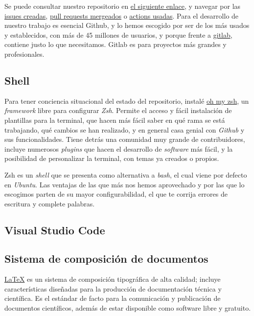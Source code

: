 Se puede consultar nuestro repositorio en \href{https://github.com/ElenaMerelo/TFG}{el siguiente enlace}, y navegar 
por las \href{https://github.com/ElenaMerelo/TFG/issues}{issues creadas}, \href{https://github.com/ElenaMerelo/TFG/pulls}{pull requests mergeados} 
o \href{https://github.com/ElenaMerelo/TFG/actions}{actions usadas}. Para el desarrollo de nuestro trabajo es esencial 
Github, y lo hemos escogido por ser de los más usados y establecidos, con más de 45 millones de usuarios, 
y porque frente a \href{https://about.gitlab.com/}{gitlab}, contiene justo lo que necesitamos. Gitlab es para proyectos 
más grandes y profesionales.

\subsection{Shell}
Para tener conciencia situacional del estado del repositorio, instalé \href{https://ohmyz.sh/}{oh my zsh}, 
un \textit{framework} libre para configurar \textit{Zsh}. Permite el acceso y fácil instalación de plantillas para 
la terminal, que hacen más fácil saber en qué rama se está trabajando, qué cambios se han realizado, y en 
general casa genial con \textit{Github} y sus funcionalidades. Tiene detrás una comunidad muy grande de 
contribuidores, incluye numerosos \textit{plugins} que hacen el desarrollo de \textit{software} más fácil, 
y la posibilidad de personalizar la terminal, con temas ya creados o propios.

{Zsh} es un \textit{shell} que se presenta como alternativa a \textit{bash}, el cual viene por defecto en 
\textit{Ubuntu}. Las ventajas de las que más nos hemos aprovechado y por las que lo escogimos parten de 
su mayor configurabilidad, el que te corrija errores de escritura y complete palabras.

\subsection{Visual Studio Code}

\subsection{Sistema de composición de documentos}
\href{https://www.latex-project.org/}{LaTeX} es un sistema de composición tipográfica de alta calidad; 
incluye características diseñadas para la producción de documentación técnica y científica. Es el estándar 
de facto para la comunicación y publicación de documentos científicos, además de estar disponible como 
software libre y gratuito. 

